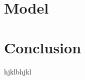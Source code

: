 \documentclass[14pt]{article}
\begin{document}
\section{Model}




\section{Conclusion}
hjklbhjkl







 
\end{document}
